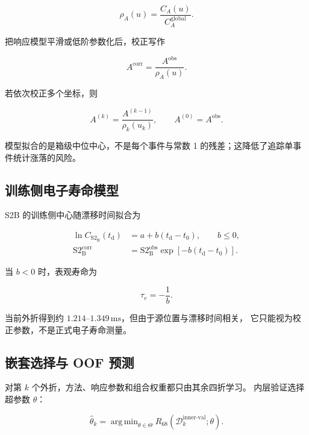 \documentclass[UTF8,12pt,a4paper,oneside,fontset=none]{ctexart}
\numberwithin{equation}{section}
\DeclareMathOperator*{\argminop}{arg\,min}
\newcommand{\StwoB}{\mathrm{S2}_{\mathrm{B}}}
\newcommand{\Rsixtyeight}{R_{68}}
\begin{document}
\begin{equation}
\rho_A(u)
=
\frac{C_A(u)}{C_A^{\mathrm{global}}}.
\label{eq:relative-response}
\end{equation}

把响应模型平滑或低阶参数化后，校正写作

\begin{equation}
A^{\mathrm{corr}}
=
\frac{A^{\mathrm{obs}}}{\rho_A(u)}.
\label{eq:response-correction}
\end{equation}

若依次校正多个坐标，则

\begin{equation}
A^{(k)}
=
\frac{A^{(k-1)}}{\rho_k(u_k)},
\qquad
A^{(0)}=A^{\mathrm{obs}}.
\label{eq:sequential-correction}
\end{equation}

模型拟合的是箱级中位中心，不是每个事件与常数 1 的残差；这降低了追踪单事件统计涨落的风险。

\subsection{训练侧电子寿命模型}

S2B 的训练侧中心随漂移时间拟合为

\begin{align}
\ln C_{\StwoB}(t_{\mathrm d})
&=a+b(t_{\mathrm d}-t_0),
\qquad b\le0,
\label{eq:lifetime-fit}\\
\StwoB^{\mathrm{corr}}
&=\StwoB^{\mathrm{obs}}
\exp\left[-b(t_{\mathrm d}-t_0)\right].
\label{eq:lifetime-correction}
\end{align}

当 \(b<0\) 时，表观寿命为

\begin{equation}
\tau_e=-\frac{1}{b}.
\label{eq:tau-from-slope}
\end{equation}

当前外折得到约 \(1.214\)--\(1.349\,\mathrm{ms}\)，但由于源位置与漂移时间相关，
它只能视为校正参数，不是正式电子寿命测量。

\subsection{嵌套选择与 OOF 预测}

对第 \(k\) 个外折，方法、响应参数和组合权重都只由其余四折学习。
内层验证选择超参数 \(\theta\)：

\begin{equation}
\widehat{\theta}_k
=
\argminop_{\theta\in\Theta}
\Rsixtyeight\!\left(
\mathcal D_{k}^{\mathrm{inner\text{-}val}};
\theta
\right).
\label{eq:inner-selection}
\end{equation}
\end{document}

